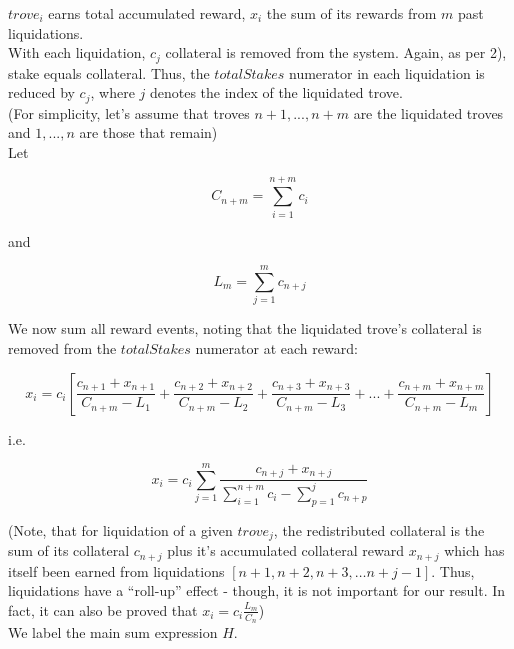 \documentclass[reqno]{article}
\begin{document}
$trove_i$ earns total accumulated reward, $x_i$  the sum of its rewards from $m$ past liquidations.\\

With each liquidation, $c_j$ collateral is removed from the system. Again, as per 2), stake equals collateral. Thus, the $totalStakes$ numerator in each liquidation is reduced by $c_j$, where $j$ denotes the index of the liquidated trove.\\ 

(For simplicity, let’s assume that troves $n+1, ..., n+m$ are the liquidated troves and $1, ..., n$ are those that remain)\\

Let

\begin{equation} 
    C_{n+m}=\sum\limits^{n+m}_{i=1}c_i
\end{equation}

\bigskip
and

\begin{equation} 
    L_m=\sum\limits^m_{j=1}c_{n+j}
\end{equation}

\bigskip
We now sum all reward events, noting that the liquidated trove’s collateral is removed from the $totalStakes$ numerator at each reward:

\begin{equation} 
    x_i=c_i\left[\frac{c_{n+1}+x_{n+1}}{C_{n+m}-L_1}+\frac{c_{n+2}+x_{n+2}}{C_{n+m}-L_2}+\frac{c_{n+3}+x_{n+3}}{C_{n+m}-L_3}+...+\frac{c_{n+m}+x_{n+m}}{C_{n+m}-L_m}\right]
\end{equation}

\bigskip
i.e.

\begin{equation} 
    x_i=c_i\sum\limits^m_{j=1}\frac{c_{n+j}+x_{n+j}}{\sum\limits^{n+m}_{i=1}c_i-\sum\limits^j_{p=1}c_{n+p}}
\end{equation}

\bigskip
(Note, that for liquidation of a given $trove_j$, the redistributed collateral is the sum of its collateral $c_{n+j}$ plus it’s accumulated collateral reward $x_{n+j}$ which has itself been earned from liquidations $[n+1, n+2, n+3, … n+j-1]$.  Thus, liquidations have a “roll-up” effect - though, it is not important for our result. In fact, it can also be proved that $x_i=c_i\frac{L_m}{C_n}$)\\

We label the main sum expression $H$.\\
\end{document}
